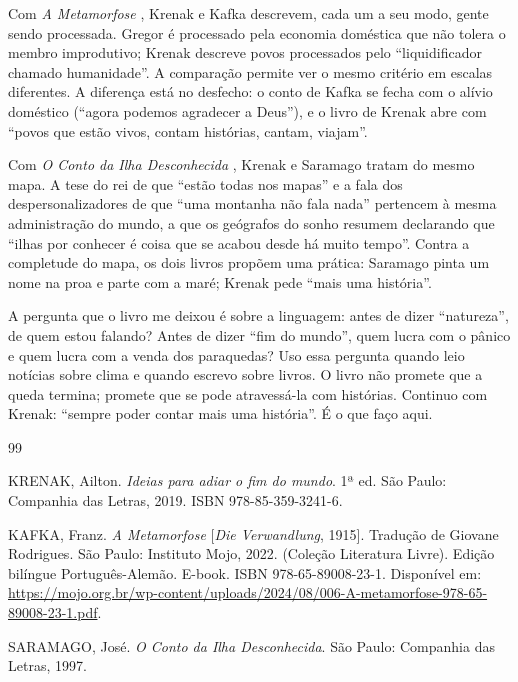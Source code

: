 \documentclass[12pt]{article}
\begin{document}
Com \emph{A Metamorfose} \cite{kafka2022}, Krenak e Kafka descrevem, cada um a seu modo, gente sendo processada. Gregor é processado pela economia doméstica que não tolera o membro improdutivo; Krenak descreve povos processados pelo ``liquidificador chamado humanidade''. A comparação permite ver o mesmo critério em escalas diferentes. A diferença está no desfecho: o conto de Kafka se fecha com o alívio doméstico (``agora podemos agradecer a Deus''), e o livro de Krenak abre com ``povos que estão vivos, contam histórias, cantam, viajam''.

Com \emph{O Conto da Ilha Desconhecida} \cite{saramago1997}, Krenak e Saramago tratam do mesmo mapa. A tese do rei de que ``estão todas nos mapas'' e a fala dos despersonalizadores de que ``uma montanha não fala nada'' pertencem à mesma administração do mundo, a que os geógrafos do sonho resumem declarando que ``ilhas por conhecer é coisa que se acabou desde há muito tempo''. Contra a completude do mapa, os dois livros propõem uma prática: Saramago pinta um nome na proa e parte com a maré; Krenak pede ``mais uma história''.

A pergunta que o livro me deixou é sobre a linguagem: antes de dizer ``natureza'', de quem estou falando? Antes de dizer ``fim do mundo'', quem lucra com o pânico e quem lucra com a venda dos paraquedas? Uso essa pergunta quando leio notícias sobre clima e quando escrevo sobre livros. O livro não promete que a queda termina; promete que se pode atravessá-la com histórias. Continuo com Krenak: ``sempre poder contar mais uma história''. É o que faço aqui.

\begin{thebibliography}{99}

KRENAK, Ailton.
\emph{Ideias para adiar o fim do mundo}.
1ª ed. São Paulo: Companhia das Letras, 2019.
ISBN 978-85-359-3241-6.

KAFKA, Franz.
\emph{A Metamorfose} [\emph{Die Verwandlung}, 1915].
Tradução de Giovane Rodrigues.
São Paulo: Instituto Mojo, 2022. (Coleção Literatura Livre).
Edição bilíngue Português-Alemão. E-book.
ISBN 978-65-89008-23-1.
Disponível em: \url{https://mojo.org.br/wp-content/uploads/2024/08/006-A-metamorfose-978-65-89008-23-1.pdf}.

SARAMAGO, José.
\emph{O Conto da Ilha Desconhecida}.
São Paulo: Companhia das Letras, 1997.

\end{thebibliography}
\end{document}
